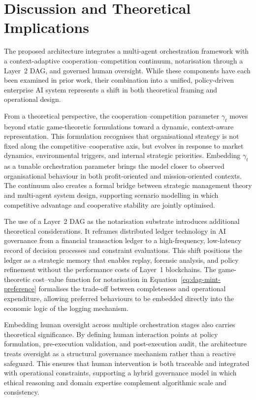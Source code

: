 \documentclass[oneside,10pt]{swissi}
\begin{document}
\section{Discussion and Theoretical Implications}\label{sec5}

The proposed architecture integrates a multi-agent orchestration framework with a context-adaptive cooperation--competition continuum, notarisation through a Layer~2 DAG, and governed human oversight. While these components have each been examined in prior work, their combination into a unified, policy-driven enterprise AI system represents a shift in both theoretical framing and operational design.

From a theoretical perspective, the cooperation--competition parameter $\gamma_t$ moves beyond static game-theoretic formulations toward a dynamic, context-aware representation. This formulation recognises that organisational strategy is not fixed along the competitive--cooperative axis, but evolves in response to market dynamics, environmental triggers, and internal strategic priorities. Embedding $\gamma_t$ as a tunable orchestration parameter brings the model closer to observed organisational behaviour in both profit-oriented and mission-oriented contexts. The continuum also creates a formal bridge between strategic management theory and multi-agent system design, supporting scenario modelling in which competitive advantage and cooperative stability are jointly optimised.

The use of a Layer~2 DAG as the notarisation substrate introduces additional theoretical considerations. It reframes distributed ledger technology in AI governance from a financial transaction ledger to a high-frequency, low-latency record of decision processes and constraint evaluations. This shift positions the ledger as a strategic memory that enables replay, forensic analysis, and policy refinement without the performance costs of Layer~1 blockchains. The game-theoretic cost–value function for notarisation in Equation~\eqref{eq:dag-mint-preference} formalises the trade-off between completeness and operational expenditure, allowing preferred behaviours to be embedded directly into the economic logic of the logging mechanism.

Embedding human oversight across multiple orchestration stages also carries theoretical significance. By defining human interaction points at policy formulation, pre-execution validation, and post-execution audit, the architecture treats oversight as a structural governance mechanism rather than a reactive safeguard. This ensures that human intervention is both traceable and integrated with operational constraints, supporting a hybrid governance model in which ethical reasoning and domain expertise complement algorithmic scale and consistency.
\end{document}
